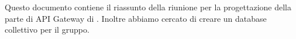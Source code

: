 Questo documento contiene il riassunto della riunione per la progettazione della parte di API Gateway di \progetto. Inoltre abbiamo cercato di creare un database collettivo per il gruppo.